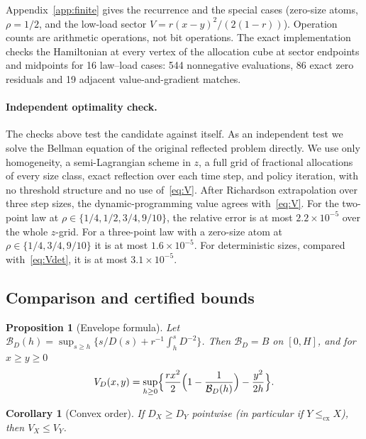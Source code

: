 \documentclass[11pt]{article}
\numberwithin{equation}{section}
\newtheorem{proposition}[theorem]{Proposition}
\newtheorem{corollary}[theorem]{Corollary}
\theoremstyle{definition}
\theoremstyle{remark}
\newcommand{\cx}{\le_{\mathrm{cx}}}
\begin{document}
Appendix~\ref{app:finite} gives the recurrence and the special cases (zero-size atoms, $\rho=1/2$, and the low-load sector $V=r(x-y)^2/(2(1-r))$). Operation counts are arithmetic operations, not bit operations. The exact implementation checks the Hamiltonian at every vertex of the allocation cube at sector endpoints and midpoints for 16 law--load cases: 544 nonnegative evaluations, 86 exact zero residuals and 19 adjacent value-and-gradient matches.

\paragraph{Independent optimality check.} The checks above test the candidate against itself. As an independent test we solve the Bellman equation of the original reflected problem directly. We use only homogeneity, a semi-Lagrangian scheme in $z$, a full grid of fractional allocations of every size class, exact reflection over each time step, and policy iteration, with no threshold structure and no use of~\eqref{eq:V}. After Richardson extrapolation over three step sizes, the dynamic-programming value agrees with~\eqref{eq:V}. For the two-point law at $\rho\in\{1/4,1/2,3/4,9/10\}$, the relative error is at most $2.2\times10^{-5}$ over the whole $z$-grid. For a three-point law with a zero-size atom at $\rho\in\{1/4,3/4,9/10\}$ it is at most $1.6\times10^{-5}$. For deterministic sizes, compared with~\eqref{eq:Vdet}, it is at most $3.1\times10^{-5}$.

\subsection{Comparison and certified bounds}

\begin{proposition}[Envelope formula]\label{prop:envelope}
Let $\mathcal B_D(h)=\sup_{s\ge h}\{s/D(s)+r^{-1}\int_h^sD^{-2}\}$. Then $\mathcal B_D=B$ on $[0,H]$, and for $x\ge y\ge0$
\begin{equation}\label{eq:envelope}
V_D(x,y)=\sup_{h\ge0}\Bigl\{\frac{rx^2}2\Bigl(1-\frac1{\mathcal B_D(h)}\Bigr)-\frac{y^2}{2h}\Bigr\}.
\end{equation}
\end{proposition}

\begin{corollary}[Convex order]\label{cor:cx}
If $D_X\ge D_Y$ pointwise (in particular if $Y\cx X$), then $V_X\le V_Y$.
\end{corollary}
\end{document}
